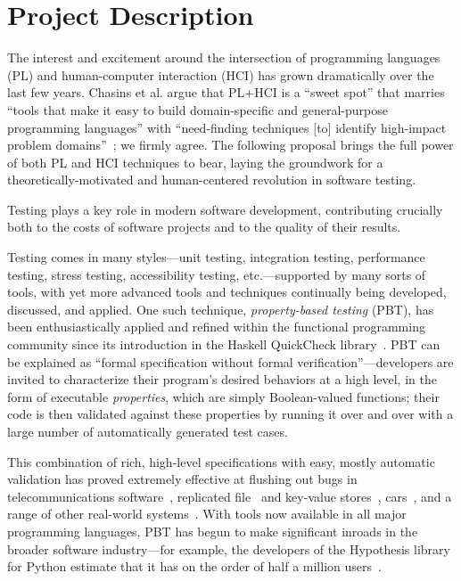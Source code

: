 \section{Project Description }

\iflater{}\fi

The interest and excitement around the intersection of programming languages
(PL) and human-computer interaction (HCI) has grown dramatically over the last
few years. Chasins et al. argue that PL+HCI is a ``sweet spot'' that marries
``tools that make it easy to build domain-specific and general-purpose
programming languages'' with ``need-finding techniques [to] identify high-impact
problem domains''~\cite{chasins_pl_2021}; we firmly agree. The following
proposal brings the full power of both PL and HCI techniques to bear, laying the
groundwork for a theoretically-motivated and human-centered revolution in software testing.

\noindent \hrulefill

Testing plays a key role in modern software development,
contributing crucially both to the costs of software projects and to
the quality of their results.

Testing comes in many styles---unit testing, integration testing,
performance testing, stress testing, accessibility testing,
etc.---supported by many sorts of tools, with yet more advanced tools
and techniques continually being developed, discussed, and applied.
%
One such technique, {\em property-based testing} (PBT), has been
enthusiastically applied and refined within the functional programming
community since its introduction in the Haskell QuickCheck
library~\cite{ClaessenHughes00}.
%
PBT can be explained as ``formal specification without formal
verification''---developers are invited to characterize their program's desired
behaviors at a high level, in the form of executable {\em properties},
which are simply Boolean-valued functions; their code is then validated against
these properties by running it over and over with a large number of
automatically generated test cases.

This combination of rich, high-level specifications with easy, mostly
automatic validation has proved extremely effective at flushing out
bugs in telecommunications software~\cite{arts2006testing}, replicated
file~\cite{hughes2014mysteries} and key-value
stores~\cite{Bornholt2021}, cars~\cite{arts2015testing}, and a range
of other real-world systems~\cite{hughes2016experiences}. With tools
now available in all major programming languages, PBT has
begun to make significant inroads in the broader software
industry---for example, the developers of the Hypothesis library for
Python estimate that it has on the order of half a million
users~\cite{ZacPersonalCommunication}.

